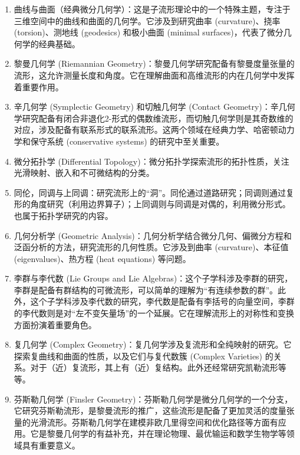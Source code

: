 \begin{enumerate}
\item 曲线与曲面（经典微分几何学）：这是子流形理论中的一个特殊主题，专注于三维空间中的曲线和曲面的几何学。它涉及到研究曲率 (curvature)、挠率 (torsion)、测地线 (geodesics) 和极小曲面 (minimal surfaces)，代表了微分几何学的经典基础。

\item 黎曼几何学 (Riemannian Geometry)：黎曼几何学研究配备有黎曼度量张量的流形，这允许测量长度和角度。它在理解曲面和高维流形的内在几何学中发挥着重要作用。

\item 辛几何学 (Symplectic Geometry) 和切触几何学 (Contact Geometry)：辛几何学研究配备有闭合非退化2-形式的偶数维流形，而切触几何学则是其奇数维的对应，涉及配备有联系形式的联系流形。这两个领域在经典力学、哈密顿动力学和保守系统 (conservative systems) 的研究中至关重要。

\item 微分拓扑学 (Differential Topology)：微分拓扑学探索流形的拓扑性质，关注光滑映射、嵌入和不可微结构的分类。

\item 同伦，同调与上同调：研究流形上的“洞”。同伦通过道路研究；同调则通过复形的角度研究（利用边界算子）；上同调则与同调是对偶的，利用微分形式。也属于拓扑学研究的内容。

\item 几何分析学 (Geometric Analysis)：几何分析学结合微分几何、偏微分方程和泛函分析的方法，研究流形的几何性质。它涉及到曲率 (curvature)、本征值 (eigenvalues)、热方程 (heat equations) 等问题。

\item 李群与李代数 (Lie Groups and Lie Algebras)：这个子学科涉及李群的研究，李群是配备有群结构的可微流形，可以简单的理解为“有连续参数的群”。此外，这个子学科涉及李代数的研究，李代数是配备有李括号的向量空间，李群的李代数则是对“左不变矢量场”的一个延展。它在理解流形上的对称性和变换方面扮演着重要角色。

\item 复几何学 (Complex Geometry)：复几何学涉及复流形和全纯映射的研究。它探索复曲线和曲面的性质，以及它们与复代数簇 (Complex Varieties) 的关系。对于（近）复流形，其上有（近）复结构。此外还经常研究凯勒流形等等。

\item 芬斯勒几何学 (Finsler Geometry)：芬斯勒几何学是微分几何学的一个分支，它研究芬斯勒流形，是黎曼流形的推广，这些流形是配备了更加灵活的度量张量的光滑流形。芬斯勒几何学在建模非欧几里得空间和优化路径等方面有应用。它是黎曼几何学的有益补充，并在理论物理、最优输运和数学生物学等领域具有重要意义。
\end{enumerate}


